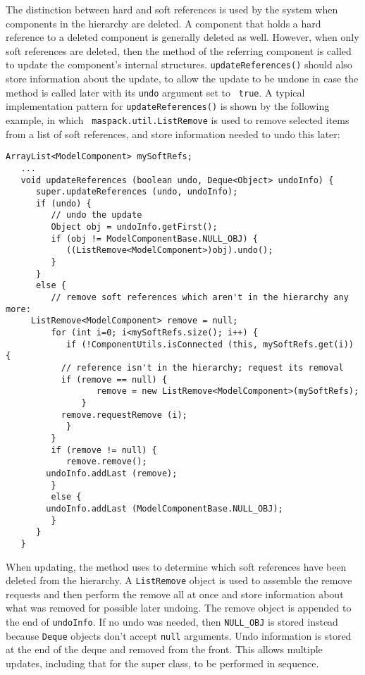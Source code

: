 \documentclass{article}
\begin{document}
The distinction between hard and soft references is used by the system
when components in the hierarchy are deleted. A component that holds a
hard reference to a deleted component is generally deleted as well.
However, when only soft references are deleted, then the
method of the referring component is called to update the component's
internal structures. {\tt updateReferences()} should also store
information about the update, to allow the update to be undone in case
the method is called later with its {\tt undo} argument set to {\tt
true}. A typical implementation pattern for {\tt updateReferences()}
is shown by the following example, in which {\tt
maspack.util.ListRemove} is used to remove selected items from a list
of soft references, and store information needed to undo this later:
\begin{lstlisting}[]
   ArrayList<ModelComponent> mySoftRefs;
   ...
   void updateReferences (boolean undo, Deque<Object> undoInfo) {
      super.updateReferences (undo, undoInfo); 
      if (undo) {
         // undo the update
         Object obj = undoInfo.getFirst();
         if (obj != ModelComponentBase.NULL_OBJ) {
            ((ListRemove<ModelComponent>)obj).undo();
         }
      }
      else {
         // remove soft references which aren't in the hierarchy any more:
	 ListRemove<ModelComponent> remove = null;
         for (int i=0; i<mySoftRefs.size(); i++) {
            if (!ComponentUtils.isConnected (this, mySoftRefs.get(i)) {
	       // reference isn't in the hierarchy; request its removal
	       if (remove == null) {
                  remove = new ListRemove<ModelComponent>(mySoftRefs);
               }
	       remove.requestRemove (i);
            }
         }
         if (remove != null) {
            remove.remove();
	    undoInfo.addLast (remove);
         }
         else {
	    undoInfo.addLast (ModelComponentBase.NULL_OBJ);
         }               
      }
   }
\end{lstlisting}
When updating, the method uses
to determine which soft
references have been deleted from the hierarchy.  A {\tt ListRemove}
object is used to assemble the remove requests and then perform the
remove all at once and store information about what was removed for
possible later undoing. The remove object is appended to the end of
{\tt undoInfo}. If no undo was needed, then {\tt NULL\_OBJ} is stored
instead because {\tt Deque} objects don't accept {\tt null} arguments.
Undo information is stored at the end of the deque and removed from
the front. This allows multiple updates, including that
for the super class, to be performed in sequence.
\end{document}
